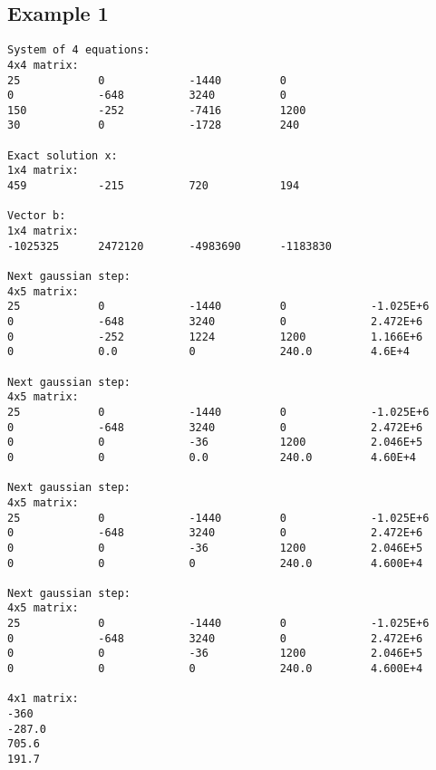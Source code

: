 \documentclass[letterpaper,12pt]{article}
\begin{document}
\subsection{Example 1}
\label{a:E1}
\begin{verbatim}
System of 4 equations:
4x4 matrix:
25            0             -1440         0             
0             -648          3240          0             
150           -252          -7416         1200          
30            0             -1728         240           

Exact solution x:
1x4 matrix:
459           -215          720           194           

Vector b:
1x4 matrix:
-1025325      2472120       -4983690      -1183830      

Next gaussian step:
4x5 matrix:
25            0             -1440         0             -1.025E+6     
0             -648          3240          0             2.472E+6      
0             -252          1224          1200          1.166E+6      
0             0.0           0             240.0         4.6E+4        

Next gaussian step:
4x5 matrix:
25            0             -1440         0             -1.025E+6     
0             -648          3240          0             2.472E+6      
0             0             -36           1200          2.046E+5      
0             0             0.0           240.0         4.60E+4       

Next gaussian step:
4x5 matrix:
25            0             -1440         0             -1.025E+6     
0             -648          3240          0             2.472E+6      
0             0             -36           1200          2.046E+5      
0             0             0             240.0         4.600E+4      

Next gaussian step:
4x5 matrix:
25            0             -1440         0             -1.025E+6     
0             -648          3240          0             2.472E+6      
0             0             -36           1200          2.046E+5      
0             0             0             240.0         4.600E+4      

4x1 matrix:
-360          
-287.0        
705.6         
191.7
\end{verbatim}
\end{document}
